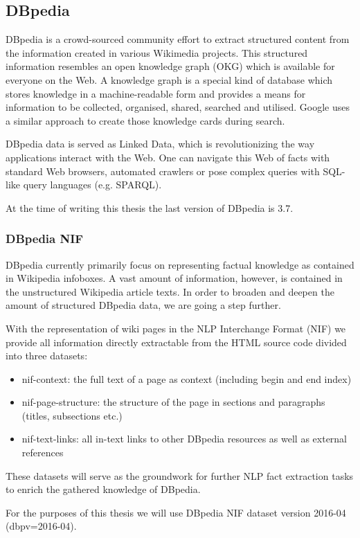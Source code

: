 \documentclass[thesis=M,english]{FITthesis}[2018/05/30]
\begin{document}
\subsection{DBpedia}
DBpedia \cite{dbpedia:core} is a crowd-sourced community effort to extract structured content from the information created in various Wikimedia projects. This structured information resembles an open knowledge graph (OKG) which is available for everyone on the Web. A knowledge graph is a special kind of database which stores knowledge in a machine-readable form and provides a means for information to be collected, organised, shared, searched and utilised. Google uses a similar approach to create those knowledge cards during search.

	DBpedia data is served as Linked Data, which is revolutionizing the way applications interact with the Web. One can navigate this Web of facts with standard Web browsers, automated crawlers or pose complex queries with SQL-like query languages (e.g. SPARQL).

	At the time of writing this thesis the last version of DBpedia is 3.7.
\subsubsection{DBpedia NIF}\label{DBpediaNIF}
	DBpedia \cite{dbpedia:NIF} currently primarily focus on representing factual knowledge as contained in Wikipedia infoboxes. A vast amount of information, however, is contained in the unstructured Wikipedia article texts. In order to broaden and deepen the amount of structured DBpedia data, we are going a step further.

	With the representation of wiki pages in the NLP Interchange Format (NIF) we provide all information directly extractable from the HTML source code divided into three datasets:
	\begin{itemize}
		\item nif-context: the full text of a page as context (including begin and end index)
		\item nif-page-structure: the structure of the page in sections and paragraphs (titles, subsections etc.)
		\item nif-text-links: all in-text links to other DBpedia resources as well as external references
	\end{itemize}
	These datasets will serve as the groundwork for further NLP fact extraction tasks to enrich the gathered knowledge of DBpedia.

For the purposes of this thesis we will use DBpedia NIF dataset version 2016-04 (dbpv=2016-04).
\end{document}
